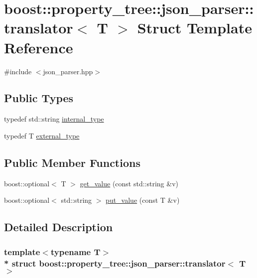 \hypertarget{structboost_1_1property__tree_1_1json__parser_1_1translator}{}\section{boost\+:\+:property\+\_\+tree\+:\+:json\+\_\+parser\+:\+:translator$<$ T $>$ Struct Template Reference}
\label{structboost_1_1property__tree_1_1json__parser_1_1translator}


{\ttfamily \#include $<$json\+\_\+parser.\+hpp$>$}

\subsection*{Public Types}
\begin{DoxyCompactItemize}
\item 
typedef std\+::string \hyperlink{structboost_1_1property__tree_1_1json__parser_1_1translator_aa6939259165594c66343c4fd2b92fee0}{internal\+\_\+type}
\item 
typedef T \hyperlink{structboost_1_1property__tree_1_1json__parser_1_1translator_a41e329b10777c2a4a756b65911746a8a}{external\+\_\+type}
\end{DoxyCompactItemize}
\subsection*{Public Member Functions}
\begin{DoxyCompactItemize}
\item 
boost\+::optional$<$ T $>$ \hyperlink{structboost_1_1property__tree_1_1json__parser_1_1translator_aef3c8478be3ecb503113f433ece01628}{get\+\_\+value} (const std\+::string \&v)
\item 
boost\+::optional$<$ std\+::string $>$ \hyperlink{structboost_1_1property__tree_1_1json__parser_1_1translator_aab997fa3043e1decab15845b61a9c801}{put\+\_\+value} (const T \&v)
\end{DoxyCompactItemize}


\subsection{Detailed Description}
\subsubsection*{template$<$typename T$>$\\*
struct boost\+::property\+\_\+tree\+::json\+\_\+parser\+::translator$<$ T $>$}



